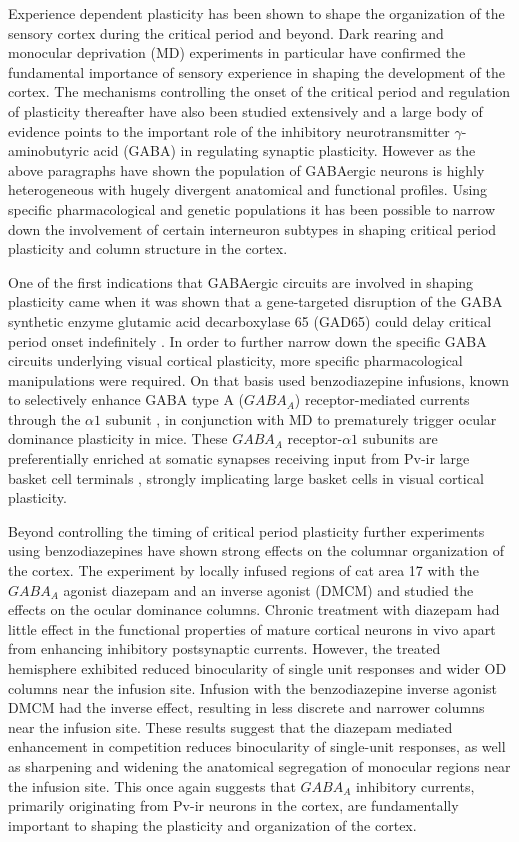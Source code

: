 Experience dependent plasticity has been shown to shape the
organization of the sensory cortex during the critical period and
beyond. Dark rearing \citep{Fregnac1978} and monocular deprivation
(MD) experiments \citep{Shatz1978} in particular have confirmed the
fundamental importance of sensory experience in shaping the
development of the cortex. The mechanisms controlling the onset of the
critical period and regulation of plasticity thereafter have also been
studied extensively and a large body of evidence points to the
important role of the inhibitory neurotransmitter
$\gamma$-aminobutyric acid (GABA) in regulating synaptic
plasticity. However as the above paragraphs have shown the population
of GABAergic neurons is highly heterogeneous with hugely divergent
anatomical and functional profiles. Using specific pharmacological and
genetic populations it has been possible to narrow down the
involvement of certain interneuron subtypes in shaping critical period
plasticity and column structure in the cortex.

One of the first indications that GABAergic circuits are involved in
shaping plasticity came when it was shown that a gene-targeted
disruption of the GABA synthetic enzyme glutamic acid decarboxylase 65
(GAD65) could delay critical period onset indefinitely
\citep{Fagiolini2000}. In order to further narrow down the specific
GABA circuits underlying visual cortical plasticity, more specific
pharmacological manipulations were required. On that basis
\cite{Fagiolini2004} used benzodiazepine infusions, known to
selectively enhance GABA type A ($GABA_A$) receptor-mediated currents
through the $\alpha1$ subunit \citep{Rudolph1999}, in conjunction with
MD to prematurely trigger ocular dominance plasticity in mice. These
$GABA_A$ receptor-$\alpha1$ subunits are preferentially enriched at
somatic synapses receiving input from Pv-ir large basket cell
terminals \citep{Klausberger2002}, strongly implicating large basket
cells in visual cortical plasticity.

Beyond controlling the timing of critical period plasticity further
experiments using benzodiazepines have shown strong effects on the
columnar organization of the cortex. The experiment by
\cite{Hensch2004} locally infused regions of cat area 17 with the
$GABA_A$ agonist diazepam and an inverse agonist (DMCM) and studied
the effects on the ocular dominance columns. Chronic treatment with
diazepam had little effect in the functional properties of mature
cortical neurons in vivo apart from enhancing inhibitory postsynaptic
currents. However, the treated hemisphere exhibited reduced
binocularity of single unit responses and wider OD columns near the
infusion site. Infusion with the benzodiazepine inverse agonist DMCM
had the inverse effect, resulting in less discrete and narrower
columns near the infusion site. These results suggest that the
diazepam mediated enhancement in competition reduces binocularity of
single-unit responses, as well as sharpening and widening the
anatomical segregation of monocular regions near the infusion
site. This once again suggests that $GABA_A$ inhibitory currents,
primarily originating from Pv-ir neurons in the cortex, are
fundamentally important to shaping the plasticity and organization of
the cortex.

